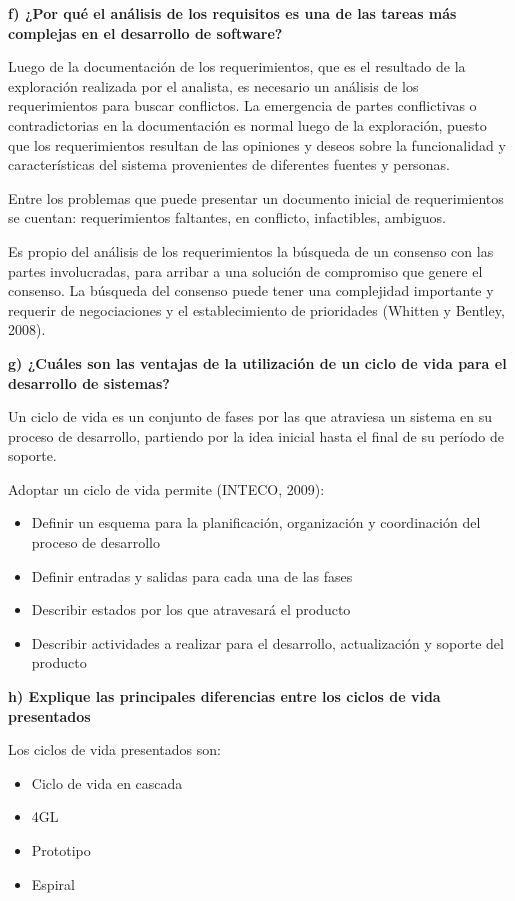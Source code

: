 \documentclass[12pt]{article}
\begin{document}
\textbf{f) ¿Por qué el análisis de los requisitos es una de las tareas más complejas en el desarrollo de software?}

Luego de la documentación de los requerimientos,
que es el resultado de la exploración realizada por el analista,
es necesario un análisis de los requerimientos para buscar conflictos.
La emergencia de partes conflictivas o contradictorias en la documentación
es normal luego de la exploración, puesto que los requerimientos resultan
de las opiniones y deseos sobre la funcionalidad y características del sistema
provenientes de diferentes fuentes y personas.

Entre los problemas que puede presentar un documento inicial de requerimientos
se cuentan: requerimientos faltantes, en conflicto, infactibles, ambiguos.

Es propio del análisis de los requerimientos la búsqueda de un consenso con
las partes involucradas, para arribar a una solución de compromiso
que genere el consenso. La búsqueda del consenso puede tener una complejidad
importante y requerir de negociaciones y el establecimiento de prioridades
(Whitten y Bentley, 2008).

\textbf{g) ¿Cuáles son las ventajas de la utilización de un ciclo de vida para el desarrollo de sistemas?}

Un ciclo de vida es un conjunto de fases por las que atraviesa un sistema
en su proceso de desarrollo, partiendo por la idea inicial hasta el final de
su período de soporte.

Adoptar un ciclo de vida permite (INTECO, 2009):
\begin{itemize}
  \item Definir un esquema para la planificación, organización y coordinación del proceso de desarrollo
  \item Definir entradas y salidas para cada una de las fases
  \item Describir estados por los que atravesará el producto
  \item Describir actividades a realizar para el desarrollo, actualización y soporte del producto
\end{itemize}

\textbf{h) Explique las principales diferencias entre los ciclos de vida presentados}

Los ciclos de vida presentados son:
\begin{itemize}
  \item Ciclo de vida en cascada
  \item 4GL
  \item Prototipo
  \item Espiral
\end{itemize}
\end{document}
